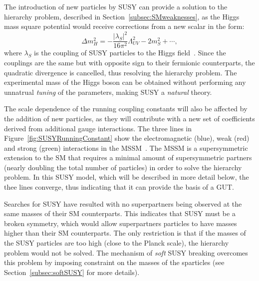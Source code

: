 
	The introduction of new particles by \ac{SUSY} can provide a solution to the hierarchy problem, described in Section~\ref{subsec:SMweaknesses}, as the Higgs mass square potential would receive corrections from a new scalar in the form:
	\begin{equation}
	\Delta m_H^2 = -\frac{|\lambda_S|^2}{16\pi^2} \Lambda_{UV}^2 -2m_S^2+\cdots, 
	\label{eq:higgs_mass}
	\end{equation}
	where $\lambda_S$ is the coupling of \ac{SUSY} particles to the Higgs field~\cite{susyprimer,Barbieri:1987fn}. 
	Since the couplings are the same but with opposite sign to their fermionic counterparts, the quadratic divergence is cancelled, thus resolving the hierarchy problem.
	The experimental mass of the Higgs boson can be obtained without performing any unnatrual \textit{tuning} of the parameters, making \ac{SUSY} a \textit{natural} theory.
	
	\SUSYRunningConstant	
	The scale dependence of the running coupling constants will also be affected by the addition of new particles, as they will contribute with a new set of coefficients derived from additional gauge interactions. 	
	The three lines in Figure~\ref{fig:SUSYRunningConstant} show the electromagnetic (blue), weak (red) and strong (green) interactions in the \ac{MSSM}~\cite{Jegerlehner:2013nna,CS_KI_1996}. 
	The \ac{MSSM} is a supersymmetric extension to the \ac{SM} that requires a minimal amount of supersymmetric partners (nearly doubling the total number of particles) in order to solve the hierarchy problem. 
	In this \ac{SUSY} model, which will be described in more detail below, the thee lines converge, thus indicating that it can provide the basis of a \ac{GUT}.
	
	
	Searches for \ac{SUSY} have resulted with no superpartners being observed at the same masses of their \ac{SM} counterparts. 
	This indicates that \ac{SUSY} must be a broken symmetry, which would allow superpartners particles to have masses higher than their \ac{SM} counterparts. 
	The only restriction is that if the masses of the \ac{SUSY} particles are too high (close to the Planck scale), the hierarchy problem would not be solved. 
	The mechanism of \textit{soft} \ac{SUSY} breaking overcomes this problem by imposing constraint on the masses of the sparticles (see Section~\ref{subsec:softSUSY} for more details).

